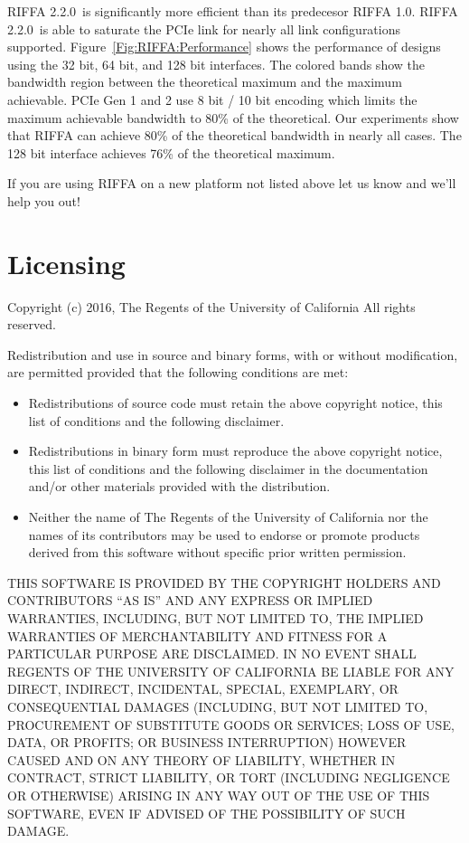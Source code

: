 \documentclass{refrep}
\newcommand{\RIFFAVer}{2.2.0}
\begin{document}
RIFFA \RIFFAVer~is significantly more efficient than its predecesor RIFFA
1.0. RIFFA \RIFFAVer~is able to saturate the PCIe link for nearly all link
configurations supported. Figure~\ref{Fig:RIFFA:Performance} shows the
performance of designs using the 32 bit, 64 bit, and 128 bit interfaces. The
colored bands show the bandwidth region between the theoretical maximum and the
maximum achievable. PCIe Gen 1 and 2 use 8 bit / 10 bit encoding which limits
the maximum achievable bandwidth to 80\% of the theoretical. Our experiments
show that RIFFA can achieve 80\% of the theoretical bandwidth in nearly all
cases. The 128 bit interface achieves 76\% of the theoretical maximum.

If you are using RIFFA on a new platform not listed above let us know and we’ll
help you out!

\section{Licensing}

Copyright (c) 2016, The Regents of the University of California All rights
reserved.

Redistribution and use in source and binary forms, with or without modification,
are permitted provided that the following conditions are met:

\begin{itemize}
    \item Redistributions of source code must retain the above copyright
      notice, this list of conditions and the following disclaimer.

    \item Redistributions in binary form must reproduce the above
      copyright notice, this list of conditions and the following
      disclaimer in the documentation and/or other materials provided
      with the distribution.

    \item Neither the name of The Regents of the University of California
      nor the names of its contributors may be used to endorse or
      promote products derived from this software without specific
      prior written permission.
\end{itemize}

THIS SOFTWARE IS PROVIDED BY THE COPYRIGHT HOLDERS AND CONTRIBUTORS ``AS IS''
AND ANY EXPRESS OR IMPLIED WARRANTIES, INCLUDING, BUT NOT LIMITED TO, THE
IMPLIED WARRANTIES OF MERCHANTABILITY AND FITNESS FOR A PARTICULAR PURPOSE ARE
DISCLAIMED. IN NO EVENT SHALL REGENTS OF THE UNIVERSITY OF CALIFORNIA BE LIABLE
FOR ANY DIRECT, INDIRECT, INCIDENTAL, SPECIAL, EXEMPLARY, OR CONSEQUENTIAL
DAMAGES (INCLUDING, BUT NOT LIMITED TO, PROCUREMENT OF SUBSTITUTE GOODS OR
SERVICES; LOSS OF USE, DATA, OR PROFITS; OR BUSINESS INTERRUPTION) HOWEVER
CAUSED AND ON ANY THEORY OF LIABILITY, WHETHER IN CONTRACT, STRICT LIABILITY, OR
TORT (INCLUDING NEGLIGENCE OR OTHERWISE) ARISING IN ANY WAY OUT OF THE USE OF
THIS SOFTWARE, EVEN IF ADVISED OF THE POSSIBILITY OF SUCH DAMAGE.
\end{document}
